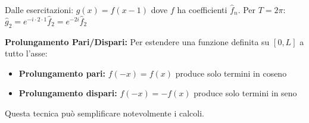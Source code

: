 \begin{esempio}
Dalle esercitazioni: $g(x) = f(x-1)$ dove $f$ ha coefficienti $\hat{f}_n$.
Per $T = 2\pi$: $\hat{g}_2 = e^{-i \cdot 2 \cdot 1} \hat{f}_2 = e^{-2i} \hat{f}_2$
\end{esempio}

\begin{info}
\textbf{Prolungamento Pari/Dispari:}
Per estendere una funzione definita su $[0,L]$ a tutto l'asse:
\begin{itemize}
    \item \textbf{Prolungamento pari:} $f(-x) = f(x)$ produce solo termini in coseno
    \item \textbf{Prolungamento dispari:} $f(-x) = -f(x)$ produce solo termini in seno
\end{itemize}
Questa tecnica può semplificare notevolmente i calcoli.
\end{info}

